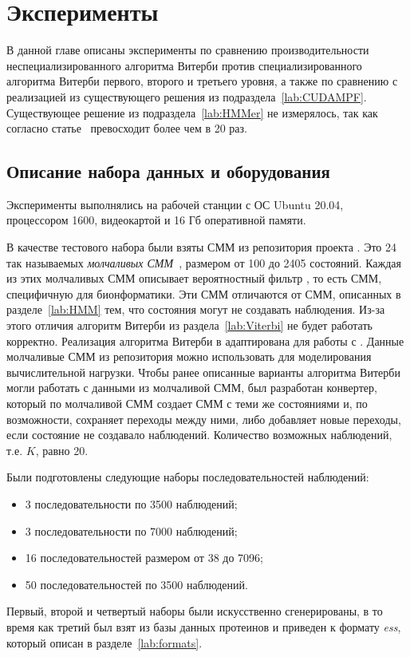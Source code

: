 \section{Эксперименты}
В данной главе описаны эксперименты по сравнению 
производительности неспециализированного алгоритма Витерби 
против специализированного алгоритма Витерби первого, второго 
и третьего уровня, а также по сравнению с реализацией из существующего решения  из 
подраздела~\ref{lab:CUDAMPF}.
Существующее решение  из подраздела~\ref{lab:HMMer} не измерялось, так как согласно статье~\cite{cudampf}  превосходит  более чем в 20 раз.

\subsection{Описание набора данных и оборудования}
Эксперименты выполнялись на рабочей станции с ОС Ubuntu 
20.04, процессором  1600, видеокартой  и 16 Гб 
оперативной памяти.

В качестве тестового набора были взяты СММ из репозитория  
проекта .
Это 24 так называемых \emph{молчаливых СММ}~\cite{silentHMM}, 
размером от 100 до 2405 состояний.
Каждая из этих молчаливых СММ описывает вероятностный фильтр , то есть СММ, специфичную для бионформатики.
Эти СММ отличаются от СММ, описанных в разделе~\ref{lab:HMM} 
тем, что состояния могут не создавать наблюдения.
Из-за этого отличия алгоритм Витерби из 
раздела~\ref{lab:Viterbi} не будет работать корректно.
Реализация алгоритма Витерби в  адаптирована для работы с .
Данные молчаливые СММ из репозитория  можно использовать 
для моделирования вычислительной нагрузки.
Чтобы ранее описанные варианты алгоритма Витерби могли 
работать с данными из молчаливой СММ, был разработан 
конвертер, который по молчаливой СММ создает СММ с теми же 
состояниями и, по возможности, сохраняет переходы между ними, 
либо добавляет новые переходы, если состояние не создавало 
наблюдений.
Количество возможных наблюдений, т.е. $K$, равно 20.

Были подготовлены следующие наборы последовательностей наблюдений:
\begin{itemize}
	\item 3 последовательности по 3500 наблюдений;
	\item 3 последовательности по 7000 наблюдений;
	\item 16 последовательностей размером от 38 до 7096;
	\item 50 последовательностей по 3500 наблюдений.
\end{itemize}
Первый, второй и четвертый наборы были искусственно сгенерированы, в то время 
как третий был взят из базы данных протеинов  и 
приведен к формату \emph{ess}, который описан в 
разделе~\ref{lab:formats}.


